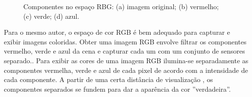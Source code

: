 \begin{figure}
    \centering
    \qquad
	\qquad
	\qquad
    \caption{Componentes no espaço RBG: (a) imagem original; (b) vermelho; (c) verde; (d) azul.}%
	    
    \label{fig:RGB}%
\end{figure}

Para o mesmo autor, o espaço de cor RGB é bem adequado para capturar e exibir imagens coloridas. Obter uma imagem RGB envolve filtrar os componentes vermelho, verde e azul da cena e capturar cada um com um conjunto de sensores separado.. Para exibir as cores de uma imagem RGB ilumina-se separadamente as componentes vermelha, verde e azul de cada pixel de acordo com a intensidade de cada componente. A partir de uma certa distância de visualização , os componentes separados se fundem para dar a aparência da cor ''verdadeira''. 

